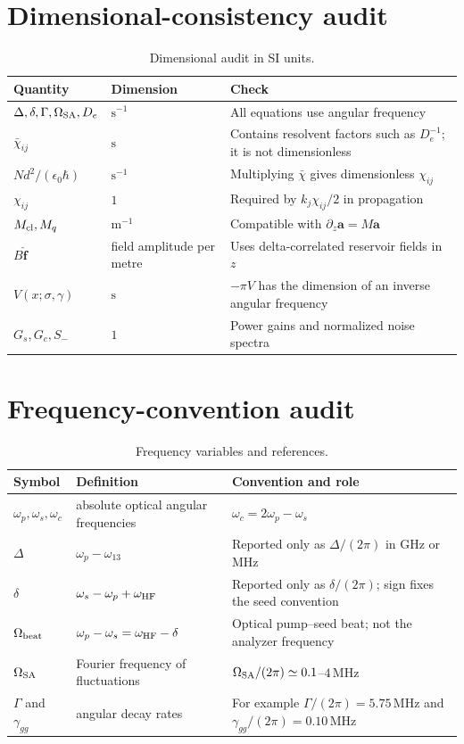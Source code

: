 \documentclass[11pt,a4paper]{article}
\newcommand{\MHz}{\,\mathrm{MHz}}
\newcommand{\chibar}{\bar\chi}
\begin{document}
\section{Dimensional-consistency audit}

\begin{table}[ht]
\centering
\caption{Dimensional audit in SI units.}
\label{tab:dimension-audit}
\small
\begin{tabularx}{\textwidth}{L{4.1cm}L{3.0cm}Y}
\toprule
Quantity & Dimension & Check\\
\midrule
$\Delta,\delta,\Gamma,\Omega_{\rm SA},D_e$ &
$\mathrm{s}^{-1}$ & All equations use angular frequency\\
$\chibar_{ij}$ & $\mathrm{s}$ &
Contains resolvent factors such as $D_e^{-1}$; it is not dimensionless\\
$Nd^2/(\epsilon_0\hbar)$ & $\mathrm{s}^{-1}$ &
Multiplying $\chibar$ gives dimensionless $\chi_{ij}$\\
$\chi_{ij}$ & $1$ & Required by $k_j\chi_{ij}/2$ in propagation\\
$M_{\rm cl},M_q$ & $\mathrm{m}^{-1}$ &
Compatible with $\partial_z\bm a=M\bm a$\\
$B\hat{\bm f}$ & field amplitude per metre &
Uses delta-correlated reservoir fields in $z$\\
$V(x;\sigma,\gamma)$ & $\mathrm{s}$ &
$-\pi V$ has the dimension of an inverse angular frequency\\
$G_s,G_c,S_-$ & $1$ & Power gains and normalized noise spectra\\
\bottomrule
\end{tabularx}
\end{table}

\clearpage
\section{Frequency-convention audit}

\begin{table}[ht]
\centering
\caption{Frequency variables and references.}
\label{tab:frequency-audit}
\small
\begin{tabularx}{\textwidth}{L{3.0cm}L{4.2cm}Y}
\toprule
Symbol & Definition & Convention and role\\
\midrule
$\omega_p,\omega_s,\omega_c$ & absolute optical angular frequencies &
$\omega_c=2\omega_p-\omega_s$\\
$\Delta$ & $\omega_p-\omega_{13}$ &
Reported only as $\Delta/(2\pi)$ in GHz or MHz\\
$\delta$ & $\omega_s-\omega_p+\omega_{\rm HF}$ &
Reported only as $\delta/(2\pi)$; sign fixes the seed convention\\
$\Omega_{\rm beat}$ & $\omega_p-\omega_s=\omega_{\rm HF}-\delta$ &
Optical pump--seed beat; not the analyzer frequency\\
$\Omega_{\rm SA}$ & Fourier frequency of fluctuations &
$\Omega_{\rm SA}/(2\pi)\simeq0.1$--$4\MHz$\\
$\Gamma$ and $\gamma_{gg}$ & angular decay rates &
For example $\Gamma/(2\pi)=5.75\MHz$ and
$\gamma_{gg}/(2\pi)=0.10\MHz$\\
\bottomrule
\end{tabularx}
\end{table}
\end{document}

